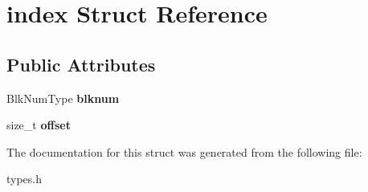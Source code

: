 \hypertarget{structindex}{}\section{index Struct Reference}
\label{structindex}
\subsection*{Public Attributes}
\begin{DoxyCompactItemize}
\item 
\mbox{\label{structindex_a4601f529cd0b66a29506c272687be78d}} 
Blk\+Num\+Type {\bfseries blknum}
\item 
\mbox{\label{structindex_a5ebe7af77c7d366b339d77f992078e11}} 
size\+\_\+t {\bfseries offset}
\end{DoxyCompactItemize}


The documentation for this struct was generated from the following file\+:\begin{DoxyCompactItemize}
\item 
types.\+h\end{DoxyCompactItemize}
